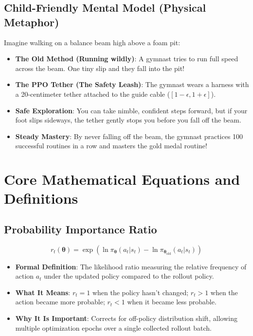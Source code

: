 \documentclass[11pt,a4paper]{article}
\theoremstyle{definition}
\begin{document}
\subsection{Child-Friendly Mental Model (Physical Metaphor)}
Imagine walking on a balance beam high above a foam pit:
\begin{itemize}
    \item \textbf{The Old Method (Running wildly)}: A gymnast tries to run full speed across the beam. One tiny slip and they fall into the pit!
    \item \textbf{The PPO Tether (The Safety Leash)}: The gymnast wears a harness with a 20-centimeter tether attached to the guide cable ($[1 - \epsilon, 1 + \epsilon]$).
    \item \textbf{Safe Exploration}: You can take nimble, confident steps forward, but if your foot slips sideways, the tether gently stops you before you fall off the beam.
    \item \textbf{Steady Mastery}: By never falling off the beam, the gymnast practices 100 successful routines in a row and masters the gold medal routine!
\end{itemize}

\section{Core Mathematical Equations and Definitions}

\subsection{Probability Importance Ratio}
{\boldmath
\begin{equation}
r_t(\boldsymbol{\theta}) = \exp\left( \ln \pi_{\boldsymbol{\theta}}(a_t | s_t) - \ln \pi_{\boldsymbol{\theta}_{\text{old}}}(a_t | s_t) \right)
\end{equation}
}
\begin{itemize}
    \item \textbf{Formal Definition}: The likelihood ratio measuring the relative frequency of action $a_t$ under the updated policy compared to the rollout policy.
    \item \textbf{What It Means}: $r_t = 1$ when the policy hasn't changed; $r_t > 1$ when the action became more probable; $r_t < 1$ when it became less probable.
    \item \textbf{Why It Is Important}: Corrects for off-policy distribution shift, allowing multiple optimization epochs over a single collected rollout batch.
\end{itemize}
\end{document}
